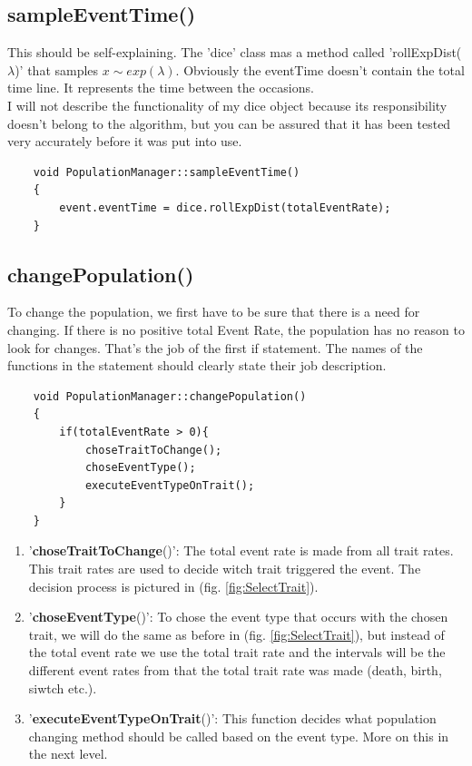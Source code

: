 \documentclass[a4paper,10pt]{scrartcl}
\begin{document}
	\subsection{sampleEventTime()} \label{subsec:sample}
	This should be self-explaining. The 'dice' class mas a method called 'rollExpDist($ \lambda $)' that samples $ x \sim exp(\lambda) $. Obviously the eventTime doesn't contain the total time line. It represents the time between the occasions.\\
	I will not describe the functionality of my dice object because its responsibility doesn't belong to the algorithm, but you can be assured that it has been tested very accurately before it was put into use.
	\begin{lstlisting} 
	void PopulationManager::sampleEventTime()
	{
	    event.eventTime = dice.rollExpDist(totalEventRate);
	}
	\end{lstlisting}
	
	\subsection{changePopulation()} \label{subsec:changePop}
	To change the population, we first have to be sure that there is a need for changing. If there is no positive total Event Rate, the population has no reason to look for changes. That's the job of the first if statement. The names of the functions in the statement should clearly state their job description.
	\begin{lstlisting} 
	void PopulationManager::changePopulation()
	{
	    if(totalEventRate > 0){
	        choseTraitToChange();
	        choseEventType();
	        executeEventTypeOnTrait();
	    }
	}
	\end{lstlisting}
	\begin{enumerate}
		\item '\textbf{choseTraitToChange}()': The total event rate is made from all trait rates. This trait rates are used to decide witch trait triggered the event. The decision process is pictured in (fig. \ref{fig:SelectTrait}).
		\item '\textbf{choseEventType}()': To chose the event type that occurs with the chosen trait, we will do the same as before in (fig. \ref{fig:SelectTrait}), but instead of the total event rate we use the total trait rate and the intervals will be the different event rates from that the total trait rate was made (death, birth, siwtch etc.).
		\item '\textbf{executeEventTypeOnTrait}()': This function decides what population changing method should be called based on the event type. More on this in the next level.
	\end{enumerate}
	
\end{document}
